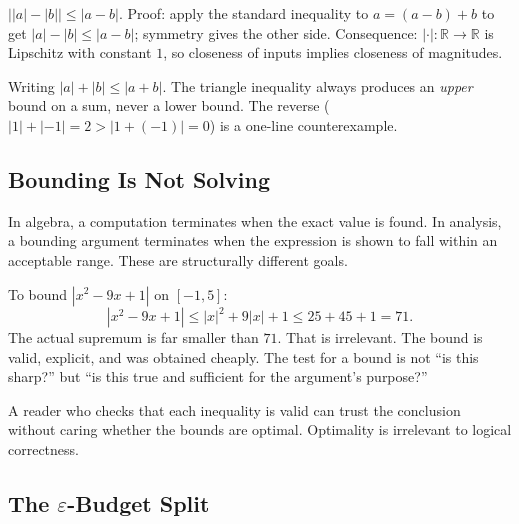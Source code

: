 \begin{remark}
\label{rem:reverse-tri}
$\bigl\lvert|a|-|b|\bigr\rvert\leq|a-b|$. Proof: apply the standard
inequality to $a=(a-b)+b$ to get $|a|-|b|\leq|a-b|$; symmetry gives the
other side. Consequence: $|\cdot|:\mathbb{R}\to\mathbb{R}$ is Lipschitz
with constant $1$, so closeness of inputs implies closeness of magnitudes.
\end{remark}

\begin{remark}
Writing $|a|+|b|\leq|a+b|$. The triangle inequality always produces an
\emph{upper} bound on a sum, never a lower bound. The reverse
($|1|+|-1|=2>|1+(-1)|=0$) is a one-line counterexample.
\end{remark}



\subsection*{Bounding Is Not Solving}
\label{subsec:bounding-not-solving}

In algebra, a computation terminates when the exact value is found. In
analysis, a bounding argument terminates when the expression is shown to
fall within an acceptable range. These are structurally different goals.

\begin{remark}
To bound $|x^2-9x+1|$ on $[-1,5]$:
\[
  |x^2-9x+1|\leq|x|^2+9|x|+1\leq 25+45+1=71.
\]
The actual supremum is far smaller than $71$. That is irrelevant. The bound
is valid, explicit, and was obtained cheaply. The test for a bound is not
``is this sharp?'' but ``is this true and sufficient for the argument's
purpose?''
\end{remark}

\begin{remark}
A reader who checks that each inequality is valid can trust the conclusion
without caring whether the bounds are optimal. Optimality is irrelevant to
logical correctness.
\end{remark}

\subsection*{\texorpdfstring{The $\varepsilon$-Budget Split}{The epsilon-Budget Split}}
\label{subsec:budget-split}

